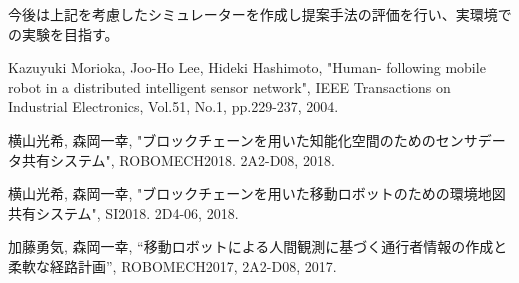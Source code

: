 \documentclass{jsarticle}
\begin{document}
今後は上記を考慮したシミュレーターを作成し提案手法の評価を行い、実環境での実験を目指す。


\footnotesize
\begin{thebibliography}{99}

Kazuyuki Morioka, Joo-Ho Lee, Hideki Hashimoto, "Human- following mobile robot in a distributed intelligent sensor network", IEEE Transactions on Industrial Electronics, Vol.51, No.1, pp.229-237, 2004.

横山光希, 森岡一幸, "ブロックチェーンを用いた知能化空間のためのセンサデータ共有システム", ROBOMECH2018. 2A2-D08, 2018.

横山光希, 森岡一幸, "ブロックチェーンを用いた移動ロボットのための環境地図共有システム", SI2018. 2D4-06, 2018.

加藤勇気, 森岡一幸, “移動ロボットによる人間観測に基づく通行者情報の作成と柔軟な経路計画”, ROBOMECH2017, 2A2-D08, 2017.




\end{thebibliography}

\normalsize
\end{document}
